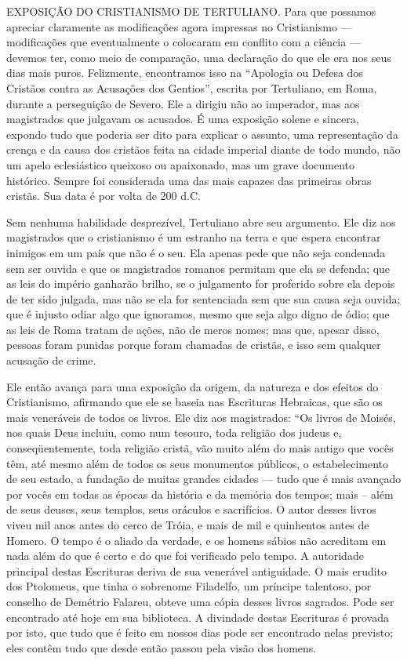 \documentclass[11pt,a5paper,twoside,openany]{book}
\begin{document}
EXPOSIÇÃO DO CRISTIANISMO DE TERTULIANO. Para que possamos apreciar claramente as modificações agora impressas no Cristianismo — modificações que eventualmente o colocaram em conflito com a ciência — devemos ter, como meio de comparação, uma declaração do que ele era nos seus dias mais puros. Felizmente, encontramos isso na “Apologia ou Defesa dos Cristãos contra as Acusações dos Gentios”, escrita por Tertuliano, em Roma, durante a perseguição de Severo. Ele a dirigiu não ao imperador, mas aos magistrados que julgavam os acusados. É uma exposição solene e sincera, expondo tudo que poderia ser dito para explicar o assunto, uma representação da crença e da causa dos cristãos feita na cidade imperial diante de todo mundo, não um apelo eclesiástico queixoso ou apaixonado, mas um grave documento histórico. Sempre foi considerada uma das mais capazes das primeiras obras cristãs. Sua data é por volta de 200 d.C.

Sem nenhuma habilidade desprezível, Tertuliano abre seu argumento. Ele diz aos magistrados que o cristianismo é um estranho na terra e que espera encontrar inimigos em um país que não é o seu. Ela apenas pede que não seja condenada sem ser ouvida e que os magistrados romanos permitam que ela se defenda; que as leis do império ganharão brilho, se o julgamento for proferido sobre ela depois de ter sido julgada, mas não se ela for sentenciada sem que sua causa seja ouvida; que é injusto odiar algo que ignoramos, mesmo que seja algo digno de ódio; que as leis de Roma tratam de ações, não de meros nomes; mas que, apesar disso, pessoas foram punidas porque foram chamadas de cristãs, e isso sem qualquer acusação de crime.

Ele então avança para uma exposição da origem, da natureza e dos efeitos do Cristianismo, afirmando que ele se baseia nas Escrituras Hebraicas, que são os mais veneráveis ​​de todos os livros. Ele diz aos magistrados: “Os livros de Moisés, nos quais Deus incluiu, como num tesouro, toda religião dos judeus e, conseqüentemente, toda religião cristã, vão muito além do mais antigo que vocês têm, até mesmo além de todos os seus monumentos públicos, o estabelecimento de seu estado, a fundação de muitas grandes cidades — tudo que é mais avançado por vocês em todas as épocas da história e da memória dos tempos; mais – além de seus deuses, seus templos, seus oráculos e sacrifícios. O autor desses livros viveu mil anos antes do cerco de Tróia, e mais de mil e quinhentos antes de Homero. O tempo é o aliado da verdade, e os homens sábios não acreditam em nada além do que é certo e do que foi verificado pelo tempo. A autoridade principal destas Escrituras deriva de sua venerável antiguidade. O mais erudito dos Ptolomeus, que tinha o sobrenome Filadelfo, um príncipe talentoso, por conselho de Demétrio Falareu, obteve uma cópia desses livros sagrados. Pode ser encontrado até hoje em sua biblioteca. A divindade destas Escrituras é provada por isto, que tudo que é feito em nossos dias pode ser encontrado nelas previsto; eles contêm tudo que desde então passou pela visão dos homens.
\end{document}
